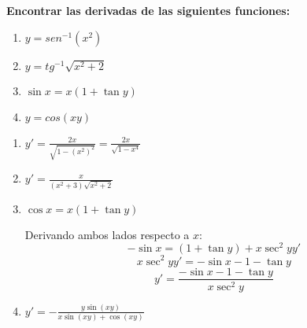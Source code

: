 \documentclass[answers]{exam} %
\begin{document}
\begin{questions}
    \question \large\textbf{Encontrar las derivadas de las siguientes funciones:}
    \begin{enumerate}[label=\alph*.]
        \item $\displaystyle y=sen^{-1}(x^2)$
        \item $\displaystyle y=tg^{-1}\sqrt{x^2+2}$
        \item $\displaystyle \sin x = x (1 + \tan y)$
        \item $\displaystyle y=cos(xy)$
    \end{enumerate}
    \begin{solution}
        \begin{enumerate}[label=\alph*.]
            \item $\displaystyle y' = \frac{2x}{\sqrt{1-(x^2)^2}} = \frac{2x}{\sqrt{1-x^4}}$
            \item $\displaystyle y' = \frac{x}{(x^2+3)\sqrt{x^2+2}}$
            \item $\displaystyle \cos x = x (1 + \tan y)$
            
            Derivando ambos lados respecto a \(x\):
            \[
            -\sin x = (1 + \tan y) + x \sec^2 y y'
            \]
            \[
            x \sec^2 y y' = -\sin x - 1 - \tan y
            \]
            \[
            y' = \frac{-\sin x - 1 - \tan y}{x \sec^2 y}
            \]
            \item $\displaystyle y' = -\frac{y \sin(xy)}{x \sin(xy) + \cos(xy)}$
        \end{enumerate}
    \end{solution}
    
    

    \vspace{0.5cm}

\end{questions}
\end{document}
